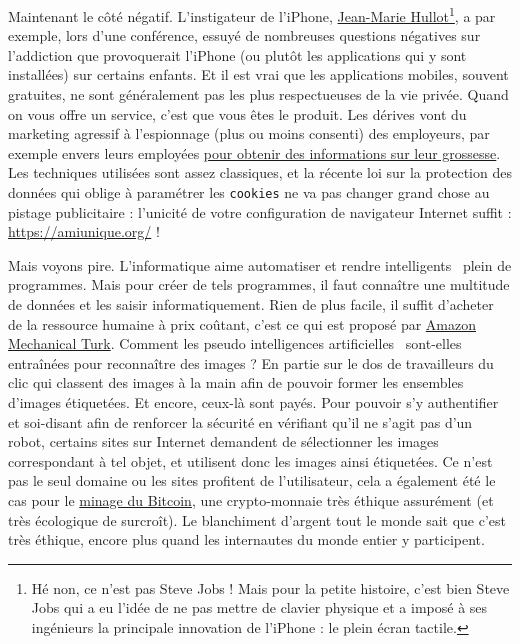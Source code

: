 \documentclass[10pt]{article}
\begin{document}
Maintenant le côté négatif. L'instigateur de l'iPhone, \href{https://fr.wikipedia.org/wiki/Jean-Marie_Hullot}{Jean-Marie Hullot}\footnote{
  Hé non, ce n'est pas Steve Jobs ! Mais pour la petite histoire, c'est bien Steve Jobs qui a eu l'idée de ne pas mettre de clavier physique
  et a imposé à ses ingénieurs la principale innovation de l'iPhone : le plein écran tactile.
}, a par exemple, lors d'une conférence, essuyé de nombreuses questions négatives sur l'addiction que provoquerait l'iPhone
(ou plutôt les applications qui y sont installées) sur certains enfants. Et il est vrai que les applications mobiles, souvent gratuites,
ne sont généralement pas les plus respectueuses de la vie privée. Quand on vous offre un service, c'est que vous êtes le produit.
Les dérives vont du marketing agressif à l'espionnage (plus ou moins consenti) des employeurs, par exemple envers leurs employées
\href{https://www.lemonde.fr/pixels/article/2019/04/12/aux-etats-unis-des-employeurs-font-main-basse-sur-les-donnees-des-applications-de-grossesse_5449283_4408996.html}{pour obtenir des informations sur leur grossesse}.
Les techniques utilisées sont assez classiques, et la récente loi sur la protection des données qui oblige à paramétrer les \texttt{cookies}
ne va pas changer grand chose au pistage publicitaire : l'unicité de votre configuration de navigateur Internet suffit :
\url{https://amiunique.org/} !


Mais voyons pire. L'informatique aime automatiser et rendre \og intelligents \fg~plein de programmes. Mais pour créer de tels programmes,
il faut connaître une multitude de données et les saisir informatiquement. Rien de plus facile, il suffit
d'acheter de la ressource humaine à prix coûtant, c'est ce qui est proposé par \href{https://www.mturk.com/}{Amazon Mechanical Turk}.
Comment les pseudo \og intelligences artificielles \fg~sont-elles entraînées pour reconnaître des images ?
En partie sur le dos de travailleurs du clic qui classent des images à la main afin de pouvoir former les ensembles d'images étiquetées.
Et encore, ceux-là sont payés. Pour pouvoir s'y authentifier et soi-disant afin de renforcer la sécurité en vérifiant qu'il ne s'agit pas d'un robot,
certains sites sur Internet demandent de sélectionner les images correspondant à tel objet, et utilisent donc les images ainsi étiquetées.
Ce n'est pas le seul domaine ou les sites profitent de l'utilisateur, cela a également été le cas pour le
\href{https://www.lemonde.fr/pixels/article/2018/01/31/ces-logiciels-qui-utilisent-votre-ordinateur-pour-fabriquer-des-cryptomonnaies_5249816_4408996.html}{minage du Bitcoin},
une crypto-monnaie très éthique assurément (et très écologique de surcroît).
Le blanchiment d'argent tout le monde sait que c'est très éthique, encore plus quand les internautes du monde entier y participent.
\end{document}
